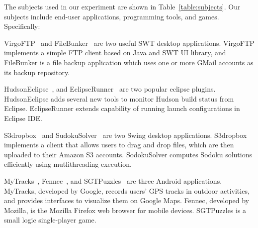 The subjects used in our experiment are shown in Table~\ref{table:subjects}. Our
subjects include end-user applications, programming tools, and games. Specifically:

\begin{itemize}
\Item VirgoFTP~\cite{virgo} and FileBunker~\cite{filebunker} are two useful
SWT desktop applications.
VirgoFTP implements a simple FTP client based on Java and SWT UI library, and
FileBunker is a file backup application which uses one or more GMail accounts as its backup repository.

\Item  HudsonEclipse~\cite{hudson}, and
EclipseRunner~\cite{eclipserunner} are two popular eclipse plugins.
HudsonEclipse adds several new tools to  monitor Hudson build status from Eclipse.
EclipseRunner extends capability of running launch configurations in Eclipse IDE.

\Item  S3dropbox~\cite{s3dropbox} and SudokuSolver~\cite{sudokusolver}
are two Swing desktop applications. S3dropbox implements a client that allows users
to drag and drop files, which are then uploaded to their Amazon S3 accounts. SodokuSolver
computes Sodoku solutions efficiently using mutlithreading execution. 

\Item  MyTracks~\cite{mytracks}, Fennec~\cite{fennec},
and SGTPuzzles~\cite{sgtpuzzles} are three Android applications.
MyTracks, developed by Google, records users' GPS tracks in outdoor activities, and provides
interfaces to visualize them on Google Maps. Fennec, developed by Mozilla, is the Mozilla
Firefox web browser for mobile devices. SGTPuzzles is a small logic single-player game.

\end{itemize}


